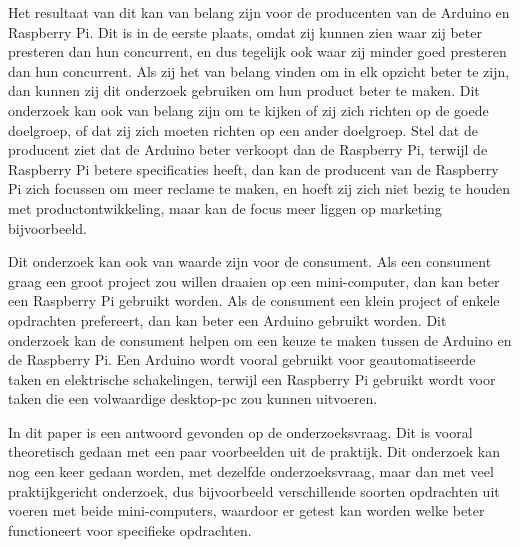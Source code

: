\documentclass[a4paper, dutch, abstract=true]{scrartcl}
\begin{document}
Het resultaat van dit kan van belang zijn voor de producenten van de Arduino en Raspberry Pi.
Dit is in de eerste plaats, omdat zij kunnen zien waar zij beter presteren dan hun concurrent, en
dus tegelijk ook waar zij minder goed presteren dan hun concurrent.
Als zij het van belang vinden om in elk opzicht beter te zijn, dan kunnen zij dit onderzoek
gebruiken om hun product beter te maken.
Dit onderzoek kan ook van belang zijn om te kijken of zij zich richten op de goede doelgroep, of dat
zij zich moeten richten op een ander doelgroep.
Stel dat de producent ziet dat de Arduino beter verkoopt dan de Raspberry Pi, terwijl de Raspberry
Pi betere specificaties heeft, dan kan de producent van de Raspberry Pi zich focussen om meer
reclame te maken, en hoeft zij zich niet bezig te houden met productontwikkeling, maar kan de focus
meer liggen op marketing bijvoorbeeld.

Dit onderzoek kan ook van waarde zijn voor de consument.
Als een consument graag een groot project zou willen draaien op een mini-computer, dan kan beter een
Raspberry Pi gebruikt worden.
Als de consument een klein project of enkele opdrachten prefereert, dan kan beter een Arduino
gebruikt worden.
Dit onderzoek kan de consument helpen om een keuze te maken tussen de Arduino en de Raspberry Pi.
Een Arduino wordt vooral gebruikt voor geautomatiseerde taken en elektrische schakelingen, terwijl
een Raspberry Pi gebruikt wordt voor taken die een volwaardige desktop-pc zou kunnen uitvoeren.

In dit paper is een antwoord gevonden op de onderzoeksvraag.
Dit is vooral theoretisch gedaan met een paar voorbeelden uit de praktijk.
Dit onderzoek kan nog een keer gedaan worden, met dezelfde onderzoeksvraag, maar dan met veel
praktijkgericht onderzoek, dus bijvoorbeeld verschillende soorten opdrachten uit voeren met beide
mini-computers, waardoor er getest kan worden welke beter functioneert voor specifieke opdrachten.

\printbibliography
\end{document}
